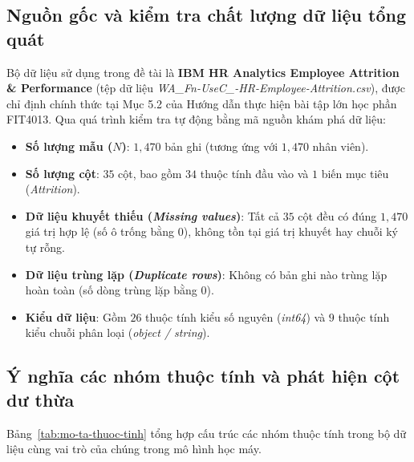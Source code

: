 \subsection{Nguồn gốc và kiểm tra chất lượng dữ liệu tổng quát}
Bộ dữ liệu sử dụng trong đề tài là \textbf{IBM HR Analytics Employee Attrition \& Performance} (tệp dữ liệu \textit{WA\_Fn-UseC\_-HR-Employee-Attrition.csv}), được chỉ định chính thức tại Mục 5.2 của Hướng dẫn thực hiện bài tập lớn học phần FIT4013. Qua quá trình kiểm tra tự động bằng mã nguồn khám phá dữ liệu:
\begin{itemize}
    \item \textbf{Số lượng mẫu ($N$)}: $1,470$ bản ghi (tương ứng với $1,470$ nhân viên).
    \item \textbf{Số lượng cột}: $35$ cột, bao gồm $34$ thuộc tính đầu vào và $1$ biến mục tiêu (\textit{Attrition}).
    \item \textbf{Dữ liệu khuyết thiếu (\textit{Missing values})}: Tất cả $35$ cột đều có đúng $1,470$ giá trị hợp lệ (số ô trống bằng $0$), không tồn tại giá trị khuyết hay chuỗi ký tự rỗng.
    \item \textbf{Dữ liệu trùng lặp (\textit{Duplicate rows})}: Không có bản ghi nào trùng lặp hoàn toàn (số dòng trùng lặp bằng $0$).
    \item \textbf{Kiểu dữ liệu}: Gồm $26$ thuộc tính kiểu số nguyên (\textit{int64}) và $9$ thuộc tính kiểu chuỗi phân loại (\textit{object / string}).
\end{itemize}

\subsection{Ý nghĩa các nhóm thuộc tính và phát hiện cột dư thừa}
Bảng~\ref{tab:mo-ta-thuoc-tinh} tổng hợp cấu trúc các nhóm thuộc tính trong bộ dữ liệu cùng vai trò của chúng trong mô hình học máy.

